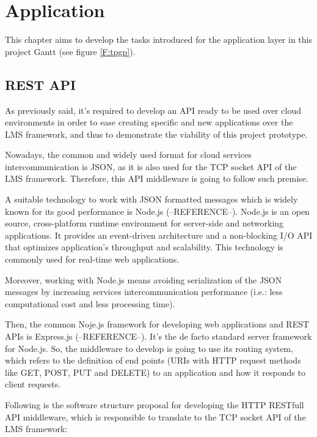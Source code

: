 \chapter{Application}\label{D:application}

This chapter aims to develop the tasks introduced for the application layer in this project Gantt (see figure \ref{F:tpgp}).

\section{REST API}

As previously said, it's required to develop an API ready to be used over cloud environments in order to ease creating specific and new applications over the LMS framework, and thus to demonstrate the viability of this project prototype.

Nowadays, the common and widely used format for cloud services intercommunication is JSON, as it is also used for the TCP socket API of the LMS framework. Therefore, this API middleware is going to follow such premise.

A suitable technology to work with JSON formatted messages which is widely known for its good performance is Node.js (--REFERENCE--). Node.js is an open source, cross-platform runtime environment for server-side and networking applications. It provides an event-driven architecture and a non-blocking I/O API that optimizes application's throughput and scalability. This technology is commonly used for real-time web applications. 

Moreover, working with Node.js means avoiding serialization of the JSON messages by increasing services intercommunication performance (i.e.: less computational cost and less processing time). 

Then, the common Noje.js framework for developing web applications and REST APIs is Express.js (--REFERENCE--). It's the de facto standard server framework for Node.js. So, the middleware to develop is going to use its routing system, which refers to the definition of end points (URIs with HTTP request methods like GET, POST, PUT and DELETE) to an application and how it responds to client requests.

Following is the software structure proposal for developing the HTTP RESTfull API middleware, which is responsible to translate to the TCP socket API of the LMS framework:


